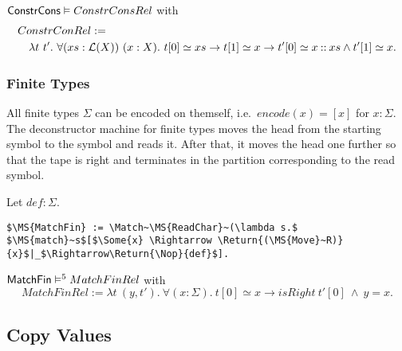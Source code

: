 \begin{lemma}
  \label{lem:Constr_cons_Realise}
  $\mathsf{ConstrCons} \mathrel{\vDash} ConstrConsRel$ with
  \begin{align*}
    & ConstrConRel := \\
    & \quad \lambda t~t'.~\forall (xs:\mathcal{L}(X))~(x:X).~t[0] \simeq xs \rightarrow t[1] \simeq x \rightarrow t'[0] \simeq x \mathbin{::} xs \land t'[1] \simeq x.
  \end{align*}
\end{lemma}


\subsubsection{Finite Types}

All finite types $\Sigma$ can be encoded on themself, i.e.\ $encode(x)=[x]$ for $x:\Sigma$.  The deconstructor machine for finite types moves the head
from the starting symbol to the symbol and reads it.  After that, it moves the head one further so that the tape is right and terminates in the
partition corresponding to the read symbol.

%
\begin{definition}[$\MS{MatchFin}$][MatchFin]
  \label{def:MatchFin}
  Let $def:\Sigma$.
  \small
\begin{lstlisting}[style=semicoqstyle]
$\MS{MatchFin} := \Match~\MS{ReadChar}~(\lambda s.$ $\MS{match}~s$[$\Some{x} \Rightarrow \Return{(\MS{Move}~R)}{x}$|_$\Rightarrow\Return{\Nop}{def}$].
\end{lstlisting}
\end{definition}

\begin{lemma}
  \label{lem:MatchFin_Sem}
  $\mathsf{MatchFin} \mathrel{\vDash^{5}} MatchFinRel$ with
  \[
    MatchFinRel := \lambda t~(y,t').~\forall(x:\Sigma).~t[0] \simeq x \rightarrow isRight~t'[0] ~\land~ y=x.
  \]
\end{lemma}




\subsection{Copy Values}
\label{sec:copy}


